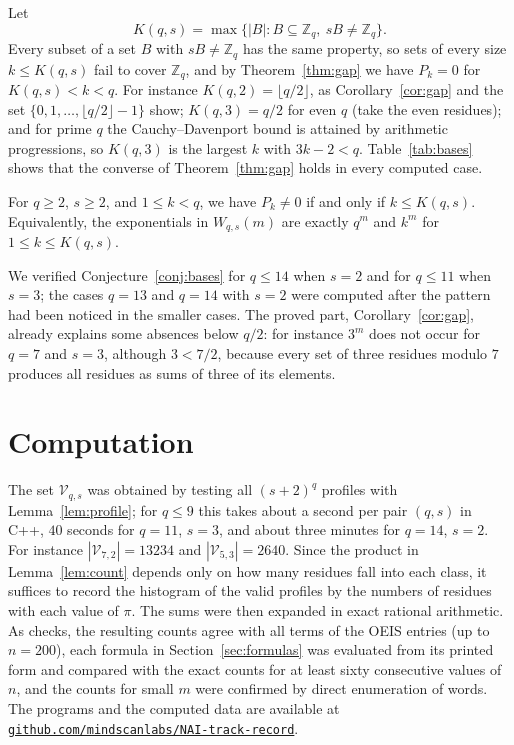 \documentclass[12pt,reqno]{article}
\newcommand{\Zq}{\mathbb{Z}_q}
\begin{document}
Let
\[
K(q,s) = \max\{|B| : B \subseteq \Zq,\ sB \ne \Zq\}.
\]
Every subset of a set $B$ with $sB \ne \Zq$ has the same property, so sets of
every size $k \le K(q,s)$ fail to cover $\Zq$, and by Theorem~\ref{thm:gap} we
have $P_k = 0$ for $K(q,s) < k < q$. For instance $K(q,2) = \lfloor q/2 \rfloor$,
as Corollary~\ref{cor:gap} and the set $\{0, 1, \ldots, \lfloor q/2 \rfloor - 1\}$
show; $K(q,3) = q/2$ for even $q$ (take the even residues); and for prime $q$ the
Cauchy--Davenport bound is attained by arithmetic progressions, so
$K(q,3)$ is the largest $k$ with $3k - 2 < q$. Table~\ref{tab:bases} shows that
the converse of Theorem~\ref{thm:gap} holds in every computed case.

\begin{conjecture}\label{conj:bases}
For $q \ge 2$, $s \ge 2$, and $1 \le k < q$, we have $P_k \ne 0$ if and only if
$k \le K(q,s)$. Equivalently, the exponentials in $W_{q,s}(m)$ are exactly
$q^m$ and $k^m$ for $1 \le k \le K(q,s)$.
\end{conjecture}

We verified Conjecture~\ref{conj:bases} for $q \le 14$ when $s = 2$ and for
$q \le 11$ when $s = 3$; the cases $q = 13$ and $q = 14$ with $s = 2$ were
computed after the pattern had been noticed in the smaller cases. The proved
part, Corollary~\ref{cor:gap}, already explains some absences below $q/2$: for
instance $3^m$ does not occur for $q = 7$ and $s = 3$, although $3 < 7/2$,
because every set of three residues modulo $7$ produces all residues as sums of
three of its elements.

\section{Computation}\label{sec:computation}

The set $\mathcal{V}_{q,s}$ was obtained by testing all $(s+2)^q$ profiles
with Lemma~\ref{lem:profile}; for $q \le 9$ this takes about a second per pair
$(q, s)$ in C++, $40$ seconds for $q = 11$, $s = 3$, and about three minutes
for $q = 14$, $s = 2$. For instance
$|\mathcal{V}_{7,2}| = 13234$ and $|\mathcal{V}_{5,3}| = 2640$. Since the
product in Lemma~\ref{lem:count} depends only on how many residues fall into
each class, it suffices to record the histogram of the valid profiles by the
numbers of residues with each value of $\pi$. The sums were then expanded in
exact rational arithmetic. As checks, the resulting counts agree with all
terms of the OEIS entries (up to $n = 200$), each formula in
Section~\ref{sec:formulas} was evaluated from its printed form and compared
with the exact counts for at least sixty consecutive values of $n$, and the
counts for small $m$ were confirmed by direct enumeration of words. The
programs and the computed data are available at
\href{https://github.com/mindscanlabs/NAI-track-record/tree/main/hardin-sumsets}{\tt github.com/mindscanlabs/NAI-track-record}.
\end{document}
